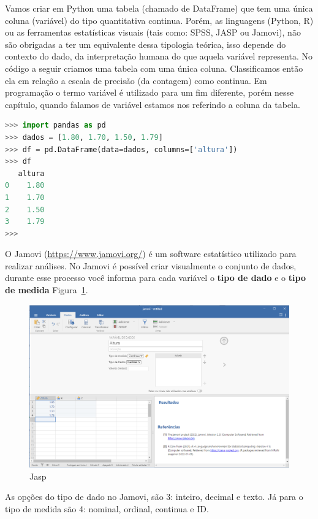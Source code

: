 \documentclass[a4paper,12pt]{book}
\begin{document}
Vamos criar em Python uma tabela (chamado de DataFrame) que tem uma única coluna (variável) do tipo quantitativa continua. Porém, as linguagens (Python, R) ou as ferramentas estatísticas visuais (tais como: SPSS, JASP ou Jamovi), não são obrigadas a ter um equivalente dessa tipologia teórica, isso depende do contexto do dado, da interpretação humana do que aquela variável representa. No código a seguir criamos uma tabela com uma única coluna. Classificamos então ela em relação a escala de precisão (da contagem) como continua. Em programação o termo variável é utilizado para um fim diferente, porém nesse capítulo, quando falamos de variável estamos nos referindo a coluna da tabela.

\begin{lstlisting}[language=Python, caption={Código que cria e exibe uma tabela em Python. A classificação teórica dessa variável é quantitativa continua.}]
>>> import pandas as pd
>>> dados = [1.80, 1.70, 1.50, 1.79]
>>> df = pd.DataFrame(data=dados, columns=['altura'])
>>> df
   altura
0    1.80
1    1.70
2    1.50
3    1.79
>>>
\end{lstlisting}

O Jamovi (\url{https://www.jamovi.org/}) é um software estatístico utilizado para realizar análises. No Jamovi é possível criar visualmente o conjunto de dados, durante esse processo você informa para cada variável o \textbf{tipo de dado} e o \textbf{tipo de medida} Figura~\ref{fig:jasp}.

\begin{figure}
\centering
\includegraphics[width=0.7\linewidth]{figuras/jasp}
\caption{Jasp}
\label{fig:jasp}
\end{figure}

As opções do tipo de dado no Jamovi, são 3: inteiro, decimal e texto. Já para o tipo de medida são 4: nominal, ordinal, continua e ID.
\end{document}
